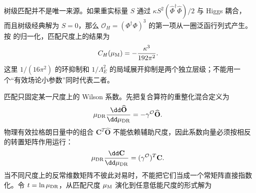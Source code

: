 树级匹配并不是唯一来源。如果重实标量 $S$ 通过 $\kappa S^2(\widehat\Phi^\dagger\widehat\Phi)/2$ 与 Higgs 耦合，而且树级经典解为 $S=0$，那么 $\mathcal O_H=(\Phi^\dagger\Phi)^3$ 的第一项从一圈泛函行列式产生。按 的归一化，匹配尺度上的结果为
\begin{equation}
{
C_H(\mu_{\rm M})=-\frac{\kappa^3}{192\pi^2}.}
\label{eq:heavy-scalar-ch-loop-dp32}
\end{equation}
这里 $1/(16\pi^2)$ 的环抑制和 $1/\Lambda_E^2$ 的局域展开抑制是两个独立层级；不能用一个“有效场论小参数”同时代表二者。

匹配只固定某一尺度上的 Wilson 系数。先把复合算符的重整化混合定义为
\begin{equation}
 \mu_{\rm DR}\frac{\dd\widehat{\mathbf O}}{\dd\mu_{\rm DR}}
 =-\gamma^{\mathcal O}\widehat{\mathbf O}.
 \label{eq:smeft-operator-rg-dp68}
\end{equation}
物理有效拉格朗日量中的组合 $\mathbf C^T\widehat{\mathbf O}$ 不能依赖辅助尺度，因此系数向量必须按相反的转置矩阵作用运行：
\begin{equation}
{
\mu_{\rm DR}\frac{\dd\mathbf C}{\dd\mu_{\rm DR}}
=(\gamma^{\mathcal O})^T\mathbf C.}
\label{eq:smeft-wilson-rg-dp32}
\end{equation}
当不同尺度上的反常维数矩阵不彼此对易时，不能把它们当成一个常矩阵直接指数化。令 $t=\ln\mu_{\rm DR}$，从匹配尺度 $\mu_{\rm M}$ 演化到任意低能尺度的形式解为


